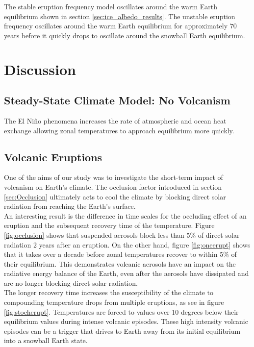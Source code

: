 \documentclass[12pt]{article}
\begin{document}
The stable eruption frequency model oscillates around the warm Earth equilibrium
shown in section \ref{sec:ice_albedo_results}. The unstable eruption frequency
oscillates around the warm Earth equilibrium for approximately
$70$ years before it quickly drops to oscillate around the snowball
Earth equilibrium.

\section{Discussion}

\subsection{Steady-State Climate Model: No Volcanism}
\label{section:steadystate}
The El Niño phenomena increases the rate of atmospheric and ocean
heat exchange allowing zonal temperatures to approach equilibrium more quickly.

\subsection{Volcanic Eruptions}
One of the aims of our study was to investigate the short-term impact of
volcanism on Earth's climate. The occlusion factor introduced in section
\ref{sec:Occlusion} ultimately acts to cool the climate by blocking direct
solar radiation from reaching the Earth's surface.\\

An interesting result is the difference in time scales for the occluding effect
of an eruption and the subsequent recovery time of the temperature. Figure
\ref{fig:occlusion} shows that suspended aerosols block less than 5\% of
direct solar radiation 2 years after an eruption. On the other hand, figure
\ref{fig:oneerupt} shows that it takes over a decade before zonal temperatures
recover to within 5\% of their equilibrium. This demonstrates volcanic aerosols
have an impact on the radiative energy balance of the Earth, even after the
aerosols have dissipated and are no longer blocking direct solar radiation.\\

The longer recovery time increases the susceptibility of the climate to compounding
temperature drops from multiple eruptions, as see in figure \ref{fig:stocherupt}.
Temperatures are forced to values over 10 degrees below their equilibrium values
during intense volcanic episodes. These high intensity volcanic
episodes can be a trigger that drives to Earth away from its initial equilibrium
into a snowball Earth state.
\end{document}

